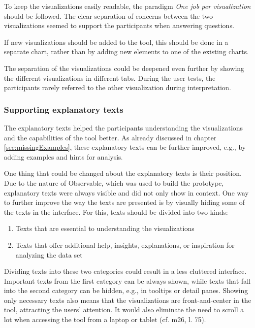 To keep the visualizations easily readable, the paradigm \emph{One job per visualization} should be followed. The clear separation of concerns between the two visualizations seemed to support the participants when answering questions. 

If new visualizations should be added to the tool, this should be done in a separate chart, rather than by adding new elements to one of the existing charts.

The separation of the visualizations could be deepened even further by showing the different visualizations in different tabs. During the user tests, the participants rarely referred to the other visualization during interpretation.

\subsubsection*{Supporting explanatory texts}
The explanatory texts helped the participants understanding the visualizations and the capabilities of the tool better. As already discussed in chapter \ref{sec:missingExamples}, these explanatory texts can be further improved, e.g., by adding examples and hints for analysis.

One thing that could be changed about the explanatory texts is their position. Due to the nature of Observable, which was used to build the prototype, explanatory texts were always visible and did not only show in context. One way to further improve the way the texts are presented is by visually hiding some of the texts in the interface. For this, texts should be divided into two kinds:
\begin{enumerate}
    \item Texts that are essential to understanding the visualizations
    \item Texts that offer additional help, insights, explanations, or inspiration for analyzing the data set
\end{enumerate}

Dividing texts into these two categories could result in a less cluttered interface. Important texts from the first category can be always shown, while texts that fall into the second category can be hidden, e.g., in tooltips or detail panes. Showing only necessary texts also means that the visualizations are front-and-center in the tool, attracting the users' attention. It would also eliminate the need to scroll a lot when accessing the tool from a laptop or tablet (cf. m26, l. 75).

